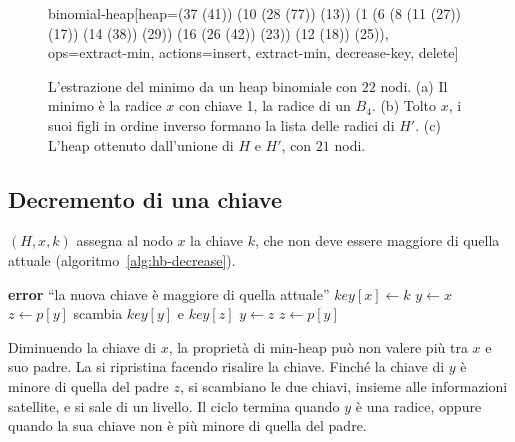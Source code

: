 \begin{figure}[htbp]
\begin{widget}{binomial-heap}[heap={(37 (41)) (10 (28 (77)) (13)) (1 (6 (8 (11 (27)) (17)) (14 (38)) (29)) (16 (26 (42)) (23)) (12 (18)) (25))}, ops={extract-min}, actions={insert, extract-min, decrease-key, delete}]
\end{widget}
\caption{L'estrazione del minimo da un heap binomiale con $22$ nodi. (a) Il minimo è la radice $x$ con chiave 1, la radice di un $B_4$. (b) Tolto $x$, i suoi figli in ordine inverso formano la lista delle radici di $H'$. (c) L'heap ottenuto dall'unione di $H$ e $H'$, con $21$ nodi.}
\label{fig:hb-estrazione}
\end{figure}

\subsection{Decremento di una chiave}\label{sec:hb-decrease}
\BinomialHeapDecreaseKey$(H,x,k)$ assegna al nodo $x$ la chiave $k$, che non deve essere maggiore di quella attuale (algoritmo~\ref{alg:hb-decrease}).

\begin{algorithm}[htbp]
\caption{Il decremento della chiave del nodo $x$: la nuova chiave risale verso la radice finché è minore di quella del padre.}\label{alg:hb-decrease}
\begin{algorithmic}[1]
    \State \textbf{error} ``la nuova chiave è maggiore di quella attuale''
  \EndIf
  \State $\mathit{key}[x] \gets k$
  \State $y \gets x$
  \State $z \gets p[y]$
    \State scambia $\mathit{key}[y]$ e $\mathit{key}[z]$ 
    \State $y \gets z$
    \State $z \gets p[y]$
  \EndWhile
\EndProcedure
\end{algorithmic}
\end{algorithm}

Diminuendo la chiave di $x$, la proprietà di min-heap può non valere più tra $x$ e suo padre. La si ripristina facendo risalire la chiave. Finché la chiave di $y$ è minore di quella del padre $z$, si scambiano le due chiavi, insieme alle informazioni satellite, e si sale di un livello. Il ciclo termina quando $y$ è una radice, oppure quando la sua chiave non è più minore di quella del padre.

